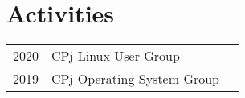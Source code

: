 \documentclass[]{deedy-resume-openfont}
\begin{document}
\begin{minipage}[t]{0.66\textwidth}

\section{Activities} 

\begin{tabular}{rll}
2020   & CPj Linux User Group\\
2019   & CPj Operating System Group\\

\end{tabular}
\sectionsep

\end{minipage} 
\end{document}
